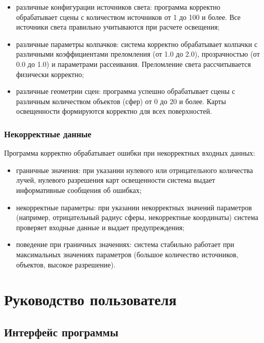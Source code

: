 \begin{itemize}
    \item различные конфигурации источников света: программа корректно обрабатывает сцены с количеством источников от 1 до 100 и более. Все источники света правильно учитываются при расчете освещения;
    
    \item различные параметры колпачков: система корректно обрабатывает колпачки с различными коэффициентами преломления (от 1.0 до 2.0), прозрачностью (от 0.0 до 1.0) и параметрами рассеивания. Преломление света рассчитывается физически корректно;
    
    \item различные геометрии сцен: программа успешно обрабатывает сцены с различным количеством объектов (сфер) от 0 до 20 и более. Карты освещенности формируются корректно для всех поверхностей.
\end{itemize}

\subsubsection{Некорректные данные}

Программа корректно обрабатывает ошибки при некорректных входных данных:

\begin{itemize}
    \item граничные значения: при указании нулевого или отрицательного количества лучей, нулевого разрешения карт освещенности система выдает информативные сообщения об ошибках;
    
    \item некорректные параметры: при указании некорректных значений параметров (например, отрицательный радиус сферы, некорректные координаты) система проверяет входные данные и выдает предупреждения;
    
    \item поведение при граничных значениях: система стабильно работает при максимальных значениях параметров (большое количество источников, объектов, высокое разрешение).
\end{itemize}

\section{Руководство пользователя}

\subsection{Интерфейс программы}

